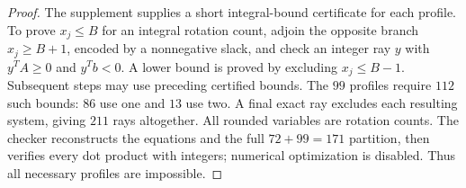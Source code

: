 \begin{proof}
The supplement supplies a short integral-bound certificate for each
profile. To prove $x_j\le B$ for an integral rotation count, adjoin the
opposite branch $x_j\ge B+1$, encoded by a nonnegative slack, and check
an integer ray $y$ with $y^TA\ge0$ and $y^Tb<0$. A lower bound is proved
by excluding $x_j\le B-1$. Subsequent steps may use preceding certified
bounds. The $99$ profiles require $112$ such bounds: $86$ use one and
$13$ use two. A final exact ray excludes each resulting system, giving
$211$ rays altogether. All rounded variables are rotation counts.
The checker reconstructs the equations and the full $72+99=171$
partition, then verifies every dot product with integers; numerical
optimization is disabled. Thus all necessary profiles are impossible.
\end{proof}
